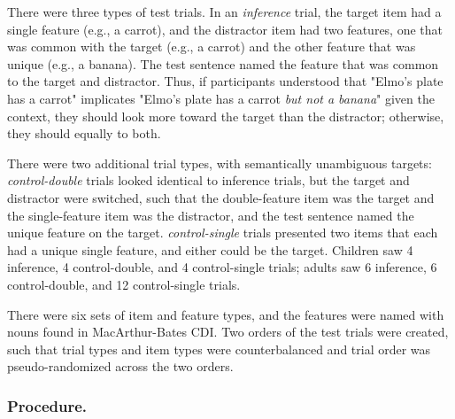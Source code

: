 \documentclass[10pt,letterpaper]{article}
\begin{document}
There were three types of test trials. In an \emph{inference} trial, the target item had a single feature (e.g., a carrot), and the distractor item had two features, one that was common with the target (e.g., a carrot) and the other feature that was unique (e.g., a banana). The test sentence named the feature that was common to the target and distractor. Thus, if participants understood that "Elmo's plate has a carrot" implicates "Elmo's plate has a carrot \emph{but not a banana}" given the context, they should look more toward the target than the distractor; otherwise, they should equally to both.

There were two additional trial types, with semantically unambiguous targets: \emph{control-double} trials looked identical to inference trials, but the target and distractor were switched, such that the double-feature item was the target and the single-feature item was the distractor, and the test sentence named the unique feature on the target. \emph{control-single} trials presented two items that each had a unique single feature, and either could be the target. Children saw 4 inference, 4 control-double, and 4 control-single trials; adults saw 6 inference, 6 control-double, and 12 control-single trials. 


There were six sets of item and feature types, and the features were named with nouns found in MacArthur-Bates CDI. Two orders of the test trials were created, such that trial types and item types were counterbalanced and trial order was pseudo-randomized across the two orders.

\vspace{12pt}

\subsubsection{Procedure.}
\end{document}
